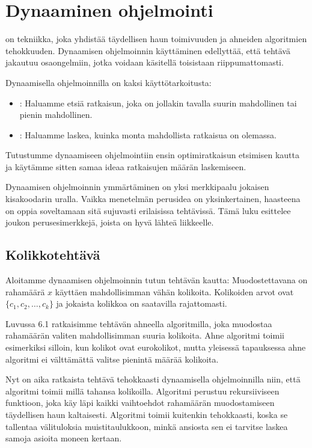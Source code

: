 \chapter{Dynaaminen ohjelmointi}


on tekniikka, joka yhdistää täydellisen haun
toimivuuden ja ahneiden algoritmien tehokkuuden.
Dynaamisen ohjelmoinnin käyttäminen edellyttää,
että tehtävä jakautuu osaongelmiin,
jotka voidaan käsitellä toisistaan riippumattomasti.

Dynaamisella ohjelmoinnilla on kaksi käyttötarkoitusta:

\begin{itemize}
\item
{}:
Haluamme etsiä ratkaisun, joka on
jollakin tavalla suurin mahdollinen
tai pienin mahdollinen.
\item
{}:
Haluamme laskea, kuinka monta mahdollista
ratkaisua on olemassa.
\end{itemize}

Tutustumme dynaamiseen ohjelmointiin ensin
optimiratkaisun etsimisen kautta ja käytämme sitten
samaa ideaa ratkaisujen määrän laskemiseen.

Dynaamisen ohjelmoinnin ymmärtäminen on yksi merkkipaalu
jokaisen kisakoodarin uralla.
Vaikka menetelmän perusidea on yksinkertainen,
haasteena on oppia soveltamaan sitä sujuvasti
erilaisissa tehtävissä.
Tämä luku esittelee joukon
perusesimerkkejä, joista on hyvä lähteä liikkeelle.

\section{Kolikkotehtävä}

Aloitamme dynaamisen ohjelmoinnin tutun tehtävän kautta:
Muodostettavana on rahamäärä $x$
käyttäen mahdollisimman vähän kolikoita.
Kolikoiden arvot ovat $\{c_1,c_2,\ldots,c_k\}$
ja jokaista kolikkoa on saatavilla rajattomasti.

Luvussa 6.1 ratkaisimme tehtävän ahneella algoritmilla,
joka muodostaa rahamäärän valiten mahdollisimman
suuria kolikoita.
Ahne algoritmi toimii esimerkiksi silloin,
kun kolikot ovat eurokolikot,
mutta yleisessä tapauksessa ahne algoritmi
ei välttämättä valitse pienintä määrää kolikoita.

Nyt on aika ratkaista tehtävä tehokkaasti
dynaamisella ohjelmoinnilla niin,
että algoritmi toimii millä tahansa kolikoilla.
Algoritmi perustuu rekursiiviseen funktioon,
joka käy läpi kaikki vaihtoehdot rahamäärän
muodostamiseen täydellisen haun kaltaisesti.
Algoritmi toimii kuitenkin tehokkaasti, koska
se tallentaa välituloksia muistitaulukkoon,
minkä ansiosta sen ei tarvitse laskea samoja
asioita moneen kertaan.

